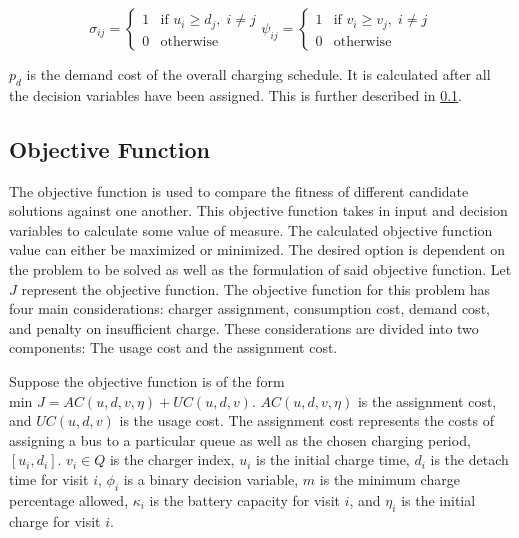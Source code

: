 \documentclass[11pt,a4paper,final]{article}
\newcommand{\AC}{AC(u, d, v, \eta)}         %
\newcommand{\UC}{UC(u, d, v)}               %
\newcommand{\Qset}{Q}                       %
\begin{document}
\begin{subequations}
\label{eq:bus-spat-temp}
\begin{equation}
  \sigma_{ij} =
  \begin{cases}
    1 & \text{if } u_i \ge d_j, \; i \ne j\\
    0 & \text{otherwise}
  \end{cases}
\end{equation}

\begin{equation}
  \psi_{ij} =
  \begin{cases}
    1 & \text{if } v_i \ge v_j,\; i \ne j\\
    0 & \text{otherwise}
  \end{cases}
\end{equation}
\end{subequations}

\(p_d\) is the demand cost of the overall charging schedule. It is calculated after all the decision variables have been
assigned. This is further described in \ref{sec:objective-function}.

\subsection{Objective Function}
\label{sec:objective-function}
The objective function is used to compare the fitness of different candidate solutions against one another. This
objective function takes in input and decision variables to calculate some value of measure. The calculated objective
function value can either be maximized or minimized. The desired option is dependent on the problem to be solved as well
as the formulation of said objective function. Let \(J\) represent the objective function. The objective function for this
problem has four main considerations: charger assignment, consumption cost, demand cost, and penalty on insufficient
charge. These considerations are divided into two components: The usage cost and the assignment cost.

Suppose the objective function is of the form \(\text{min } J = \AC + \UC\). \(\AC\) is the assignment cost, and \(\UC\) is
the usage cost. The assignment cost represents the costs of assigning a bus to a particular queue as well as the chosen
charging period, \([u_i, d_i]\). \(v_i \in \Qset\) is the charger index, \(u_i\) is the initial charge time, \(d_i\) is the detach
time for visit \(i\), \(\phi_i\) is a binary decision variable, \(m\) is the minimum charge percentage allowed, \(\kappa_i\) is the
battery capacity for visit \(i\), and \(\eta_i\) is the initial charge for visit \(i\).
\end{document}
